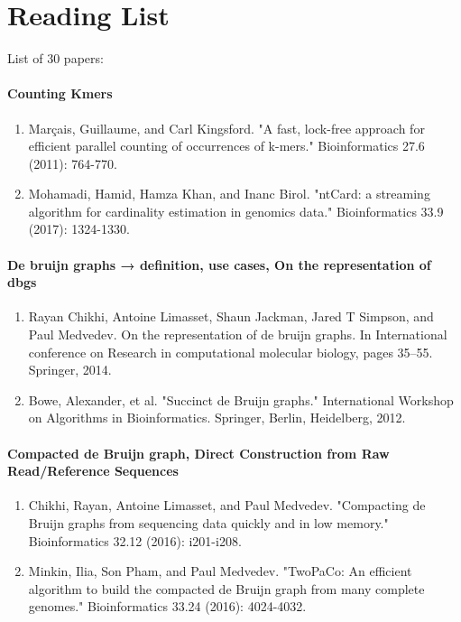 
\chapter{Reading List}
\label{chap:readingList}

List of 30 papers:
\subsubsection{Counting Kmers}
\begin{enumerate}
    \item Marçais, Guillaume, and Carl Kingsford. "A fast, lock-free approach for efficient parallel counting of occurrences of k-mers." Bioinformatics 27.6 (2011): 764-770.
    \item Mohamadi, Hamid, Hamza Khan, and Inanc Birol. "ntCard: a streaming algorithm for cardinality estimation in genomics data." Bioinformatics 33.9 (2017): 1324-1330.
\end{enumerate}
\subsubsection{De bruijn graphs → definition, use cases, On the representation of dbgs}
\begin{enumerate}
    \item Rayan Chikhi, Antoine Limasset, Shaun Jackman, Jared T Simpson, and Paul Medvedev. On the representation of de bruijn graphs. In International conference on Research in computational molecular biology, pages 35–55. Springer, 2014.
    \item Bowe, Alexander, et al. "Succinct de Bruijn graphs." International Workshop on Algorithms in Bioinformatics. Springer, Berlin, Heidelberg, 2012.
\end{enumerate}
\subsubsection{Compacted de Bruijn graph, Direct Construction from Raw Read/Reference Sequences}
\begin{enumerate}
    \item Chikhi, Rayan, Antoine Limasset, and Paul Medvedev. "Compacting de Bruijn graphs from sequencing data quickly and in low memory." Bioinformatics 32.12 (2016): i201-i208.
    \item Minkin, Ilia, Son Pham, and Paul Medvedev. "TwoPaCo: An efficient algorithm to build the compacted de Bruijn graph from many complete genomes." Bioinformatics 33.24 (2016): 4024-4032.
\end{enumerate}

